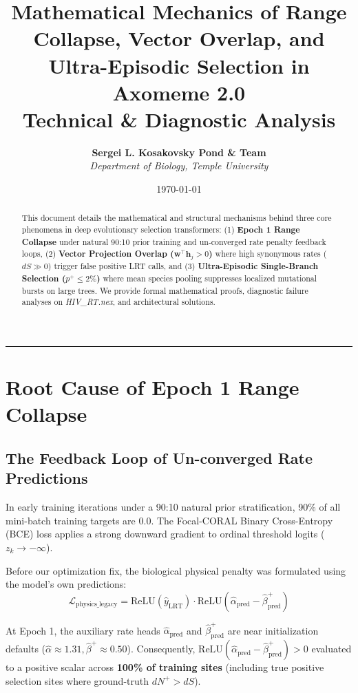 \documentclass[11pt,a4paper]{article}
\title{\textbf{\Huge Mathematical Mechanics of Range Collapse, Vector Overlap, and Ultra-Episodic Selection in Axomeme 2.0}\\ \Large Technical & Diagnostic Analysis}
\author{\textbf{Sergei L. Kosakovsky Pond \& Team}\\ \textit{Department of Biology, Temple University}}
\date{\today}
\begin{document}
\maketitle

\begin{abstract}
\noindent This document details the mathematical and structural mechanisms behind three core phenomena in deep evolutionary selection transformers: (1) \textbf{Epoch 1 Range Collapse} under natural 90:10 prior training and un-converged rate penalty feedback loops, (2) \textbf{Vector Projection Overlap ($\mathbf{w}^\top \mathbf{h}_j > 0$)} where high synonymous rates ($dS \gg 0$) trigger false positive LRT calls, and (3) \textbf{Ultra-Episodic Single-Branch Selection ($p^+ \le 2\%$)} where mean species pooling suppresses localized mutational bursts on large trees. We provide formal mathematical proofs, diagnostic failure analyses on \textit{HIV\_RT.nex}, and architectural solutions.
\end{abstract}

\vspace{1em}\hrule\vspace{1em}

\section{Root Cause of Epoch 1 Range Collapse}

\subsection{The Feedback Loop of Un-converged Rate Predictions}
In early training iterations under a 90:10 natural prior stratification, 90\% of all mini-batch training targets are $0.0$. The Focal-CORAL Binary Cross-Entropy (BCE) loss applies a strong downward gradient to ordinal threshold logits ($z_k \to -\infty$).

Before our optimization fix, the biological physical penalty was formulated using the model's own predictions:
\begin{equation}
\mathcal{L}_{\text{physics\_legacy}} = \text{ReLU}\left(\hat{y}_{\text{LRT}}\right) \cdot \text{ReLU}\left(\hat{\alpha}_{\text{pred}} - \hat{\beta}^+_{\text{pred}}\right)
\end{equation}

At Epoch 1, the auxiliary rate heads $\hat{\alpha}_{\text{pred}}$ and $\hat{\beta}^+_{\text{pred}}$ are near initialization defaults ($\hat{\alpha} \approx 1.31, \hat{\beta}^+ \approx 0.50$). Consequently, $\text{ReLU}(\hat{\alpha}_{\text{pred}} - \hat{\beta}^+_{\text{pred}}) > 0$ evaluated to a positive scalar across \textbf{100\% of training sites} (including true positive selection sites where ground-truth $dN^+ > dS$).
\end{document}
